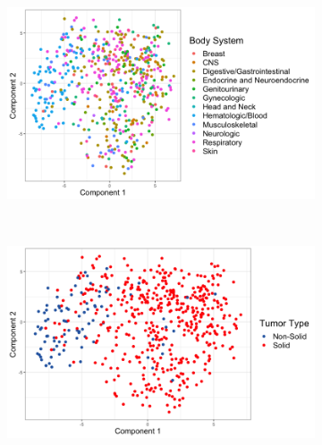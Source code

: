 \documentclass[10pt, letterpaper]{article}
\begin{document}
\begin{multicols}{2}
\begin{figure}[!ht]
	\centering
	\begin{subfigure}[t]{0.5\textwidth}
		\centering
		\includegraphics[width=\columnwidth]{Figures/pca_m/body_system.png}
		\caption{}
		\label{fig:body_sys}
	\end{subfigure}%
	~
	\begin{subfigure}[t]{0.5\textwidth}
		\centering
		\includegraphics[width=0.97\columnwidth]{Figures/pca_m/tumortype.png}
		\caption{}
		\label{fig:tumor_type}
	\end{subfigure}
	

\end{figure}
\end{multicols}
\end{document}
